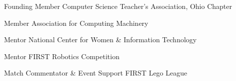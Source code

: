 


\begin{cvhonors}


\cvhonor
{Founding Member} %
{Computer Science Teacher's Association, Ohio Chapter} %
{} %


\cvhonor
{Member} %
{Association for Computing Machinery} %
{} %


\cvhonor
{Mentor} %
{National Center for Women \& Information Technology} %
{} %


\cvhonor
{Mentor} %
{FIRST Robotics Competition} %
{} %


\cvhonor
{Match Commentator \& Event Support} %
{FIRST Lego League} %
{} %


\end{cvhonors}